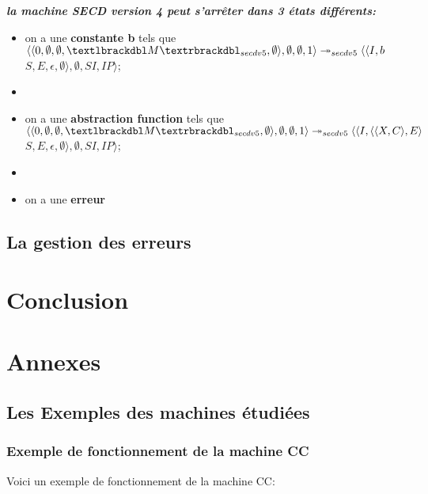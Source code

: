 \documentclass[10pt,a4paper]{article}
\begin{document}
				
				\textbf{\textit{la machine SECD version 4 peut s'arrêter dans 3 états différents:}}
				\smallbreak
				\begin{itemize}
					\item[] on a une \textbf{constante b} tels que 
					$\langle\langle 0,\emptyset,\emptyset,\textlbrackdbl M\textrbrackdbl_{secdv5},\emptyset\rangle,\emptyset,\emptyset,1\rangle 
					\twoheadrightarrow_{secdv5} 
					\langle\langle I,b$ $S,E,\epsilon,\emptyset\rangle,\emptyset,SI,IP\rangle$;
					\item[] 
					\item[] on a une \textbf{abstraction function} tels que
					$\langle\langle 0,\emptyset,\emptyset,\textlbrackdbl M\textrbrackdbl_{secdv5},\emptyset\rangle,\emptyset,\emptyset,1\rangle 
					\twoheadrightarrow_{secdv5} 
					\langle\langle I,\langle\langle X,C\rangle,E\rangle$ $S,E,\epsilon,\emptyset\rangle,\emptyset,SI,IP\rangle$;
					\item[] 
					\item[] on a une \textbf{erreur} 
				\end{itemize}
				\newpage
	
	
	
			\subsection{La gestion des erreurs}
	
	\section{Conclusion}
		
		\newpage
		
		
		
	\section{Annexes}
		
		\subsection{Les Exemples des machines étudiées}
	
			\subsubsection{Exemple de fonctionnement de la machine CC}\label{CC}
			
				Voici un exemple de fonctionnement de la machine CC:
					
\end{document}
